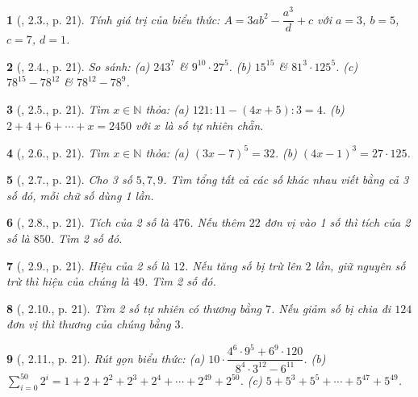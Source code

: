 \documentclass{article}
\newtheorem{baitoan}{}
\begin{document}
\begin{baitoan}[\cite{Binh_boi_duong_Toan_6_tap_1}, 2.3., p. 21]
	Tính giá trị của biểu thức: $A = 3ab^2 -  \dfrac{a^3}{d} + c$ với $a = 3$, $b = 5$, $c = 7$, $d = 1$.
\end{baitoan}

\begin{baitoan}[\cite{Binh_boi_duong_Toan_6_tap_1}, 2.4., p. 21]
	So sánh: (a) $243^7$ \& $9^{10}\cdot27^5$. (b) $15^{15}$ \& $81^3\cdot125^5$. (c) $78^{15} - 78^{12}$ \& $78^{12} - 78^9$.
\end{baitoan}

\begin{baitoan}[\cite{Binh_boi_duong_Toan_6_tap_1}, 2.5., p. 21]
	Tìm $x\in\mathbb{N}$ thỏa: (a) $121:11 - (4x + 5):3 = 4$. (b) $2 + 4 + 6 + \cdots + x = 2450$ với $x$ là số tự nhiên chẵn.
\end{baitoan}

\begin{baitoan}[\cite{Binh_boi_duong_Toan_6_tap_1}, 2.6., p. 21]
	Tìm $x\in\mathbb{N}$ thỏa: (a) $(3x - 7)^5 = 32$. (b) $(4x - 1)^3 = 27\cdot125$.
\end{baitoan}

\begin{baitoan}[\cite{Binh_boi_duong_Toan_6_tap_1}, 2.7., p. 21]
	Cho 3 số $5,7,9$. Tìm tổng tất cả các số khác nhau viết bằng cả 3 số đó, mỗi chữ số dùng 1 lần.
\end{baitoan}

\begin{baitoan}[\cite{Binh_boi_duong_Toan_6_tap_1}, 2.8., p. 21]
	Tích của 2 số là $476$. Nếu thêm $22$ đơn vị vào 1 số thì tích của 2 số là $850$. Tìm 2 số đó.
\end{baitoan}

\begin{baitoan}[\cite{Binh_boi_duong_Toan_6_tap_1}, 2.9., p. 21]
	Hiệu của 2 số là $12$. Nếu tăng số bị trừ lên $2$ lần, giữ nguyên số trừ thì hiệu của chúng là $49$. Tìm 2 số đó.
\end{baitoan}

\begin{baitoan}[\cite{Binh_boi_duong_Toan_6_tap_1}, 2.10., p. 21]
	Tìm 2 số tự nhiên có thương bằng $7$. Nếu giảm số bị chia đi $124$ đơn vị thì thương của chúng bằng $3$.
\end{baitoan}

\begin{baitoan}[\cite{Binh_boi_duong_Toan_6_tap_1}, 2.11., p. 21]
	Rút gọn biểu thức: (a) $10\cdot\dfrac{4^6\cdot9^5 + 6^9\cdot120}{8^4\cdot3^{12} - 6^{11}}$. (b) $\sum_{i=0}^{50} 2^i = 1 + 2 + 2^2 + 2^3 + 2^4 + \cdots + 2^{49} + 2^{50}$. (c) $5 + 5^3 + 5^5 + \cdots + 5^{47} + 5^{49}$.
\end{baitoan}
\end{document}
